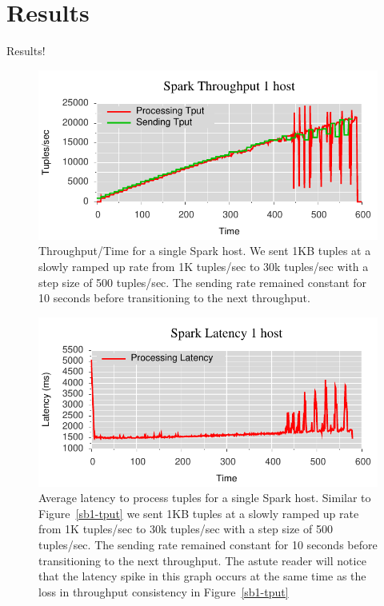 \section{Results}
Results!

\begin{figure}[t]
\centering
\includegraphics[width=1\linewidth]{figures/sp1_tput.pdf}
\caption{Throughput/Time for a single Spark host. We sent 1KB tuples at a slowly ramped up rate from 1K tuples/sec to 30k tuples/sec with a step size of 500 tuples/sec. The sending rate remained constant for 10 seconds before transitioning to the next throughput.}
\label{fig:sb1-tput}
\end{figure}

\begin{figure}[t]
\centering
\includegraphics[width=1\linewidth]{figures/sp1_latency.pdf}
\caption{Average latency to process tuples for a single Spark host. Similar to Figure~\ref{sb1-tput} we sent 1KB tuples at a slowly ramped up rate from 1K tuples/sec to 30k tuples/sec with a step size of 500 tuples/sec. The sending rate remained constant for 10 seconds before transitioning to the next throughput. The astute reader will notice that the latency spike in this graph occurs at the same time as the loss in throughput consistency in Figure~\ref{sb1-tput}}
\label{fig:label-me-if-you-want}
\end{figure}

